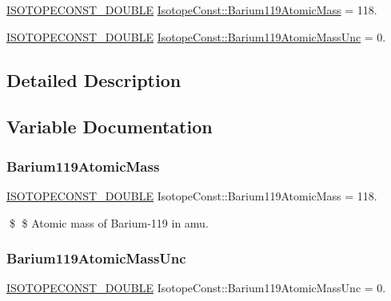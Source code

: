 \begin{DoxyCompactItemize}
\item 
\mbox{\hyperlink{group___isotope_const-_macros_ga8f45a7272ce02c0b4c65c44636ed719a}{I\+S\+O\+T\+O\+P\+E\+C\+O\+N\+S\+T\+\_\+\+D\+O\+U\+B\+LE}} \mbox{\hyperlink{group___isotope_const-_barium-_ba119_gaca2dd6281121b897aabfb4b316e1b4ca}{Isotope\+Const\+::\+Barium119\+Atomic\+Mass}} = 118.
\item 
\mbox{\hyperlink{group___isotope_const-_macros_ga8f45a7272ce02c0b4c65c44636ed719a}{I\+S\+O\+T\+O\+P\+E\+C\+O\+N\+S\+T\+\_\+\+D\+O\+U\+B\+LE}} \mbox{\hyperlink{group___isotope_const-_barium-_ba119_gade4bafb916b9274200bf2aa0ccdcf3f0}{Isotope\+Const\+::\+Barium119\+Atomic\+Mass\+Unc}} = 0.
\end{DoxyCompactItemize}


\subsection{Detailed Description}


\subsection{Variable Documentation}
\mbox{\label{group___isotope_const-_barium-_ba119_gaca2dd6281121b897aabfb4b316e1b4ca}} 
\subsubsection{\texorpdfstring{Barium119\+Atomic\+Mass}{Barium119AtomicMass}}
{\footnotesize\ttfamily \mbox{\hyperlink{group___isotope_const-_macros_ga8f45a7272ce02c0b4c65c44636ed719a}{I\+S\+O\+T\+O\+P\+E\+C\+O\+N\+S\+T\+\_\+\+D\+O\+U\+B\+LE}} Isotope\+Const\+::\+Barium119\+Atomic\+Mass = 118.}

\$ \$ Atomic mass of Barium-\/119 in amu. \mbox{\label{group___isotope_const-_barium-_ba119_gade4bafb916b9274200bf2aa0ccdcf3f0}} 
\subsubsection{\texorpdfstring{Barium119\+Atomic\+Mass\+Unc}{Barium119AtomicMassUnc}}
{\footnotesize\ttfamily \mbox{\hyperlink{group___isotope_const-_macros_ga8f45a7272ce02c0b4c65c44636ed719a}{I\+S\+O\+T\+O\+P\+E\+C\+O\+N\+S\+T\+\_\+\+D\+O\+U\+B\+LE}} Isotope\+Const\+::\+Barium119\+Atomic\+Mass\+Unc = 0.}

